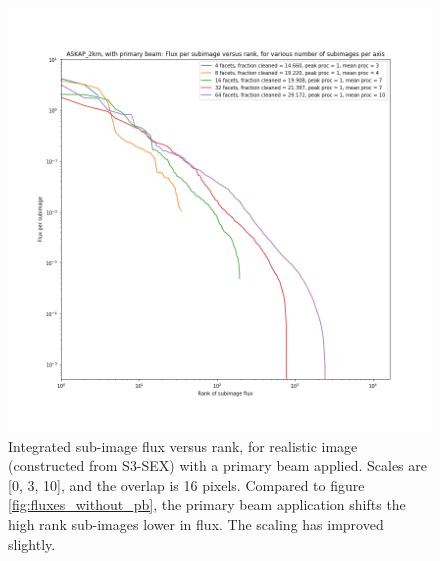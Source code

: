 \documentclass[11pt,a4paper,variablewidth]{article}
\begin{document}
\begin{figure}[h]
  \centering
  \includegraphics[width=\textwidth]{./pngs/fluxes_with_pb_ASKAP_2km.png}
  \caption{Integrated sub-image flux versus rank, for realistic image (constructed from S3-SEX) with a primary beam applied. Scales are [0, 3, 10], and the overlap is 16 pixels. Compared to figure \ref{fig:fluxes_without_pb}, the primary beam application shifts the high rank sub-images lower in flux. The scaling has improved slightly.}
  \label{fig:fluxes_with_pb}
\end{figure}
\end{document}
